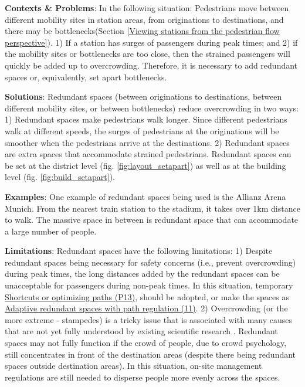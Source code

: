 \documentclass[]{article}
\begin{document}
{\textbf{Contexts \& Problems}: In the following situation:
Pedestrians move between different mobility sites in station areas, from originations to destinations, and there may be bottlenecks(Section \ref{Viewing stations from the pedestrian flow perspective}). 
1) If a station has surges of passengers during peak times; and 
2) if the mobility sites or bottlenecks are too close, then the strained passengers will quickly be added up to overcrowding.
Therefore, it is necessary to add redundant spaces or, equivalently, set apart bottlenecks.

\textbf{Solutions}: Redundant spaces (between originations to destinations, between different mobility sites, or between bottlenecks) reduce overcrowding in two ways:
1) Redundant spaces make pedestrians walk longer. Since different pedestrians walk at different speeds, the surges of pedestrians at the originations will be smoother when the pedestrians arrive at the destinations.
2) Redundant spaces are extra spaces that accommodate strained pedestrians.
Redundant spaces can be set at the district level (fig. \ref{fig:layout_setapart}) as well as at the building level (fig. \ref{fig:build_setapart}).

\textbf{Examples}: One example of redundant spaces being used is the Allianz Arena Munich. From the nearest train station to the stadium, it takes over 1km distance to walk. The massive space in between is redundant space that can accommodate a large number of people.

\textbf{Limitations}: Redundant spaces have the following limitations:
1) Despite redundant spaces being necessary for safety concerns (i.e., prevent overcrowding) during peak times, the long distances added by the redundant spaces can be unacceptable for passengers during non-peak times. In this situation, temporary \hyperref[(P13) Shortcuts or optimizing paths]{Shortcuts or optimizing paths (P13)}, should be adopted, or make the spaces as \hyperref[(11) Adaptive redundant spaces with path regulation]{Adaptive redundant spaces with path regulation (11)}.
2) Overcrowding (or the more extreme - stampedes) is a tricky issue that is associated with many causes that are not yet fully understood by existing scientific research \citep{almeidaHumanStampedesUpdated2019}. Redundant spaces may not fully function if the crowd of people, due to crowd psychology, still concentrates in front of the destination areas (despite there being redundant spaces outside destination areas). In this situation, on-site management regulations are still needed to disperse people more evenly across the spaces.

}
\end{document}

